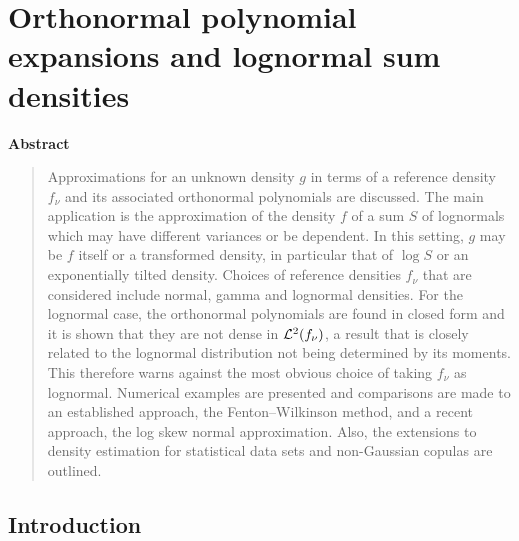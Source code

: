 \chapter{Orthonormal polynomial expansions and lognormal sum densities}

\begin{center}
\textbf{Abstract}
\end{center}
\begin{quote}
Approximations for an unknown density $g$ in terms of a reference density $f_\nu$
and its associated orthonormal polynomials are discussed. The main application is
the approximation of the density $f$ of a sum $S$ of lognormals which may have different
variances or be dependent. In this setting, $g$ may be $f$ itself or a transformed
density, in particular that of $\log S$ or an exponentially tilted density.  Choices
of reference densities $f_\nu$ that are considered include normal, gamma and lognormal densities.
For the lognormal case, the orthonormal polynomials are found in closed form
and it is shown that they are not dense in $\mathcal{L}^2(f_\nu)$, a result that is closely related
to the lognormal distribution not being determined by its moments. This therefore warns against the most
obvious choice of taking $f_\nu$ as lognormal. Numerical examples are presented
and comparisons are made to an established approach, the Fenton--Wilkinson method, and a recent approach, the
log skew normal approximation. Also, the extensions to density estimation for statistical data sets and non-Gaussian copulas
are outlined.
\end{quote}



\section{Introduction}\label{S:SLN_Ortho_PDF_Intr}

